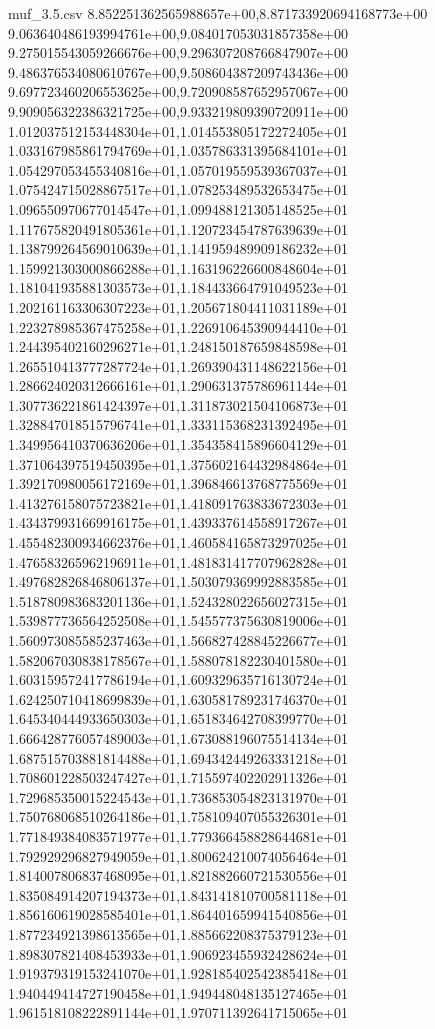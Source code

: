 \begin{filecontents*}{muf_3.5.csv}
8.852251362565988657e+00,8.871733920694168773e+00
9.063640486193994761e+00,9.084017053031857358e+00
9.275015543059266676e+00,9.296307208766847907e+00
9.486376534080610767e+00,9.508604387209743436e+00
9.697723460206553625e+00,9.720908587652957067e+00
9.909056322386321725e+00,9.933219809390720911e+00
1.012037512153448304e+01,1.014553805172272405e+01
1.033167985861794769e+01,1.035786331395684101e+01
1.054297053455340816e+01,1.057019559539367037e+01
1.075424715028867517e+01,1.078253489532653475e+01
1.096550970677014547e+01,1.099488121305148525e+01
1.117675820491805361e+01,1.120723454787639639e+01
1.138799264569010639e+01,1.141959489909186232e+01
1.159921303000866288e+01,1.163196226600848604e+01
1.181041935881303573e+01,1.184433664791049523e+01
1.202161163306307223e+01,1.205671804411031189e+01
1.223278985367475258e+01,1.226910645390944410e+01
1.244395402160296271e+01,1.248150187659848598e+01
1.265510413777287724e+01,1.269390431148622156e+01
1.286624020312666161e+01,1.290631375786961144e+01
1.307736221861424397e+01,1.311873021504106873e+01
1.328847018515796741e+01,1.333115368231392495e+01
1.349956410370636206e+01,1.354358415896604129e+01
1.371064397519450395e+01,1.375602164432984864e+01
1.392170980056172169e+01,1.396846613768775569e+01
1.413276158075723821e+01,1.418091763833672303e+01
1.434379931669916175e+01,1.439337614558917267e+01
1.455482300934662376e+01,1.460584165873297025e+01
1.476583265962196911e+01,1.481831417707962828e+01
1.497682826846806137e+01,1.503079369992883585e+01
1.518780983683201136e+01,1.524328022656027315e+01
1.539877736564252508e+01,1.545577375630819006e+01
1.560973085585237463e+01,1.566827428845226677e+01
1.582067030838178567e+01,1.588078182230401580e+01
1.603159572417786194e+01,1.609329635716130724e+01
1.624250710418699839e+01,1.630581789231746370e+01
1.645340444933650303e+01,1.651834642708399770e+01
1.666428776057489003e+01,1.673088196075514134e+01
1.687515703881814488e+01,1.694342449263331218e+01
1.708601228503247427e+01,1.715597402202911326e+01
1.729685350015224543e+01,1.736853054823131970e+01
1.750768068510264186e+01,1.758109407055326301e+01
1.771849384083571977e+01,1.779366458828644681e+01
1.792929296827949059e+01,1.800624210074056464e+01
1.814007806837468095e+01,1.821882660721530556e+01
1.835084914207194373e+01,1.843141810700581118e+01
1.856160619028585401e+01,1.864401659941540856e+01
1.877234921398613565e+01,1.885662208375379123e+01
1.898307821408453933e+01,1.906923455932428624e+01
1.919379319153241070e+01,1.928185402542385418e+01
1.940449414727190458e+01,1.949448048135127465e+01
1.961518108222891144e+01,1.970711392641715065e+01

\end{filecontents*}
